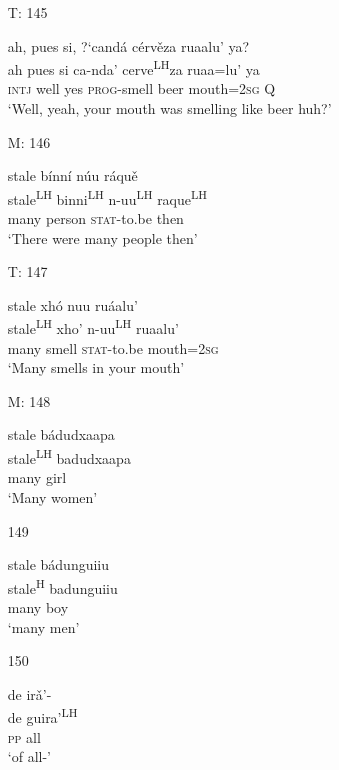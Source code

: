 \begin{itemize}
\item[T: 145]
 
\glll   ah, pues si, {?`}cand\'{a} c\'{e}rv\v{e}za ruaalu' ya?\\
ah pues si ca-nda'  cerve\textsuperscript{LH}za ruaa=lu' ya\\
\textsc{intj} well yes \textsc{prog}-smell  beer mouth=\textsc{2sg} \textsc{Q}\\
\glt `Well, yeah, your mouth was smelling like beer huh?'
 


\item[M: 146]
 
\glll   stale b\'{i}nn\'{i} n\'{u}u r\'{a}qu\v{e}\\
stale\textsuperscript{LH} binni\textsuperscript{LH} n-uu\textsuperscript{LH} raque\textsuperscript{LH}\\
many person \textsc{stat}-to.be then\\
\glt `There were many people then'
 

\item[T: 147]
  
\glll   stale xh\'{o} nuu ru\'{a}alu'\\
stale\textsuperscript{LH}  xho' n-uu\textsuperscript{LH} ruaalu'\\
many smell \textsc{stat}-to.be mouth=\textsc{2sg}\\
\glt `Many smells in your mouth'
 


\item[M: 148]
 
\glll   stale b\'{a}dudxaapa\\
stale\textsuperscript{LH} badudxaapa\\
many girl\\
\glt `Many women'
 


\item[149]
 
\glll   stale b\'{a}dunguiiu\\
stale\textsuperscript{H} badunguiiu\\
many boy\\
\glt `many men'
 


\item[150]
 
\glll   de ir\v{a}'-\\
de guira'\textsuperscript{LH}\\
\textsc{pp} all\\
\glt `of all-' 
 




\end{itemize}
